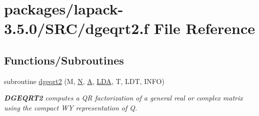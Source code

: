 \hypertarget{dgeqrt2_8f}{}\section{packages/lapack-\/3.5.0/\+S\+R\+C/dgeqrt2.f File Reference}
\label{dgeqrt2_8f}
\subsection*{Functions/\+Subroutines}
\begin{DoxyCompactItemize}
\item 
subroutine \hyperlink{group__doubleGEcomputational_gaf52830cc84214fbf513bb7f520095aa9}{dgeqrt2} (M, \hyperlink{polmisc_8c_a0240ac851181b84ac374872dc5434ee4}{N}, \hyperlink{classA}{A}, \hyperlink{example__user_8c_ae946da542ce0db94dced19b2ecefd1aa}{L\+D\+A}, T, L\+D\+T, I\+N\+F\+O)
\begin{DoxyCompactList}\small\item\em {\bfseries D\+G\+E\+Q\+R\+T2} computes a Q\+R factorization of a general real or complex matrix using the compact W\+Y representation of Q. \end{DoxyCompactList}\end{DoxyCompactItemize}
